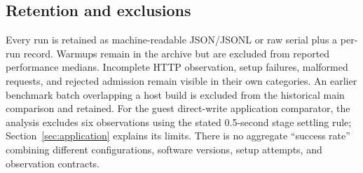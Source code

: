 \subsection{Retention and exclusions}
Every run is retained as machine-readable JSON/JSONL or raw serial plus a
per-run record. Warmups remain in the archive but are excluded from reported
performance medians. Incomplete HTTP observation, setup failures, malformed
requests, and rejected admission remain visible in their own categories.
An earlier benchmark batch overlapping a host build is excluded from the
historical main comparison and retained. For the guest direct-write application
comparator, the analysis excludes six observations using the stated 0.5-second
stage settling rule; Section~\ref{sec:application} explains its limits. There is
no aggregate ``success rate'' combining different configurations, software
versions, setup attempts, and observation contracts.
